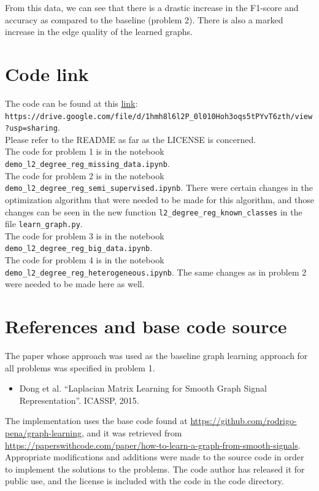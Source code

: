 \documentclass[a4paper]{article}
\newcommand{\nl}{\vspace{0.2cm}\\}
\begin{document}
From this data, we can see that there is a drastic increase in the F1-score and accuracy as compared to the baseline (problem 2). There is also a marked increase in the edge quality of the
learned graphs.

\newpage

\section{Code link}

The code can be found at this \href{https://drive.google.com/file/d/1hmh8l6l2P_0l010Hoh3oqs5tPYvT6zth/view?usp=sharing}{link}:\nl
\verb+https://drive.google.com/file/d/1hmh8l6l2P_0l010Hoh3oqs5tPYvT6zth/view?usp=sharing+.\nl
Please refer to the README as far as the LICENSE is concerned.\nl

The code for problem 1 is in the notebook \verb+demo_l2_degree_reg_missing_data.ipynb+.\nl
The code for problem 2 is in the notebook \verb+demo_l2_degree_reg_semi_supervised.ipynb+. There were certain changes in the optimization algorithm that were needed to be made for this algorithm, and those changes can be
seen in the new function \verb+l2_degree_reg_known_classes+ in the file \verb+learn_graph.py+.\nl
The code for problem 3 is in the notebook \verb+demo_l2_degree_reg_big_data.ipynb+.\nl
The code for problem 4 is in the notebook \verb+demo_l2_degree_reg_heterogeneous.ipynb+. The same changes as in problem 2 were needed to be made here as well.

\section{References and base code source}

The paper whose approach was used as the baseline graph learning approach for all problems was specified in problem 1.

\begin{itemize}
    \item Dong et al. ``Laplacian Matrix Learning for Smooth Graph Signal Representation''. ICASSP, 2015.
\end{itemize}

The implementation uses the base code found at \href{https://github.com/rodrigo-pena/graph-learning}{https://github.com/rodrigo-pena/graph-learning}, and it was retrieved from
\href{https://paperswithcode.com/paper/how-to-learn-a-graph-from-smooth-signals}{https://paperswithcode.com/paper/how-to-learn-a-graph-from-smooth-signals}. 
Appropriate modifications and additions were made to the source code in order to implement the solutions to the problems.
The code author has released it for public use, and the license is included with the code in the code
directory.\nl
\end{document}
